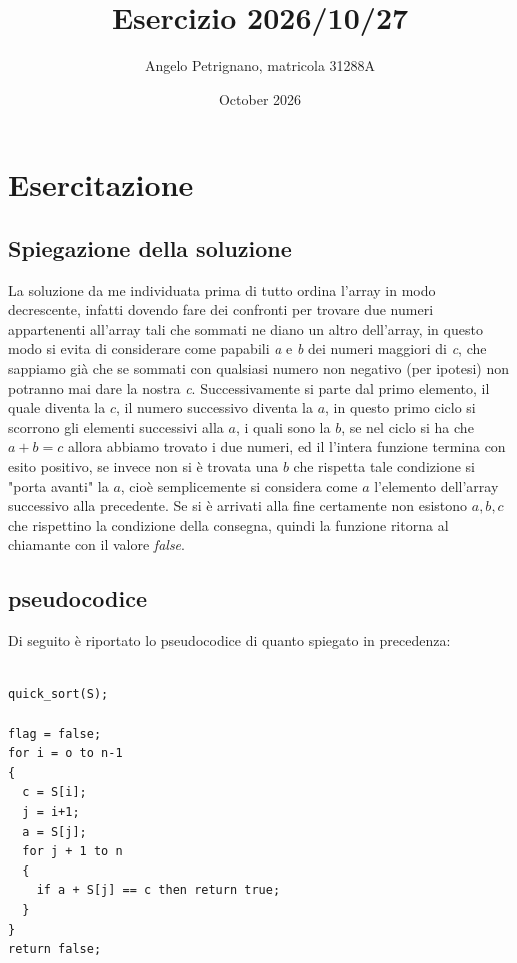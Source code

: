 \documentclass{article}
\title{Esercizio 2026/10/27}
\author{Angelo Petrignano, matricola 31288A}
\date{October 2026}
\begin{document}
\maketitle

\section{Esercitazione}

\subsection{Spiegazione della soluzione}

La soluzione da me individuata prima di tutto ordina l'array in modo decrescente, infatti dovendo fare dei confronti per trovare due numeri appartenenti all'array tali che sommati ne diano un altro dell'array, in questo modo si evita di considerare come papabili \textit{a} e \textit{b} dei numeri maggiori di \textit{c}, che sappiamo già che se sommati con qualsiasi numero non negativo (per ipotesi) non potranno mai dare la nostra \textit{c}.
Successivamente si parte dal primo elemento, il quale diventa la $ c $, il numero successivo diventa la $ a $, in questo primo ciclo si scorrono gli elementi successivi alla $ a $, i quali sono la $ b $,  se nel ciclo si ha che $a + b = c $ allora abbiamo trovato i due numeri, ed il l'intera funzione termina con esito positivo, se invece non si è trovata una $ b $ che rispetta tale condizione 
si "porta avanti" la $ a $, cioè semplicemente si considera come $ a  $ l'elemento dell'array successivo alla precedente.
Se si è arrivati alla fine certamente non esistono $ a, b, c $ che rispettino la condizione della consegna, quindi la funzione ritorna al chiamante con il valore \textit{false}.

\subsection{pseudocodice}
Di seguito è riportato lo pseudocodice di quanto spiegato in precedenza:

\begin{verbatim}

quick_sort(S);

flag = false;
for i = o to n-1
{
  c = S[i];
  j = i+1; 
  a = S[j];
  for j + 1 to n
  {
    if a + S[j] == c then return true;
  }
}
return false;

\end{verbatim}
\end{document}
